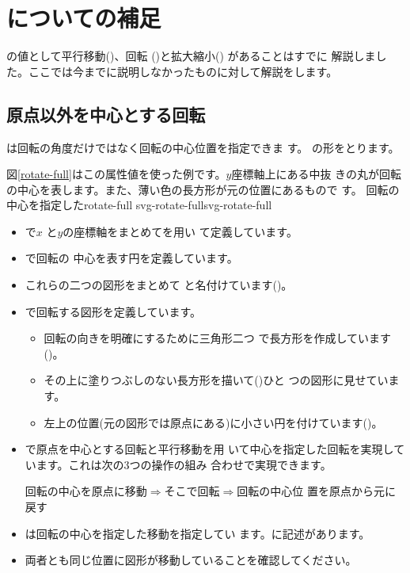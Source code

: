 \section{についての補足}
の値として平行移動()、回転
()と拡大縮小() があることはすでに
解説しました。ここでは今までに説明しなかったものに対して解説をします。
\subsection{原点以外を中心とする回転}
は回転の角度だけではなく回転の中心位置を指定できま
す。
の形をとります。

図\ref{rotate-full}はこの属性値を使った例です。$y$座標軸上にある中抜
きの丸が回転の中心を表します。また、薄い色の長方形が元の位置にあるもので
す。
         {回転の中心を指定した}{rotate-full}
\vspace{-\baselineskip}
         {svg-rotate-full}{svg-rotate-full}
\begin{itemize}
 \item {}で$x$ と$y$の座標軸をまとめてを用い
       て定義しています。
 \item {}で回転の
       中心を表す円を定義しています。
 \item これらの二つの図形をまとめて
       と名付けています()。
 \item {}で回転する図形を定義しています。
\begin{itemize}
 \item 回転の向きを明確にするために三角形二つ
       で長方形を作成しています()。
 \item その上に塗りつぶしのない長方形を描いて()ひと
       つの図形に見せています。
 \item 左上の位置(元の図形では原点にある)に小さい円を付けています()。
\end{itemize}
 \item {}で原点を中心とする回転と平行移動を用
       いて中心を指定した回転を実現しています。これは次の3つの操作の組み
       合わせで実現できます。
\begin{center}
 回転の中心を原点に移動$\Rightarrow$そこで回転$\Rightarrow$回転の中心位
 置を原点から元に戻す
\end{center}
 \item {}は回転の中心を指定した移動を指定してい
       ます。に記述があります。
 \item 両者とも同じ位置に図形が移動していることを確認してください。
\end{itemize}
